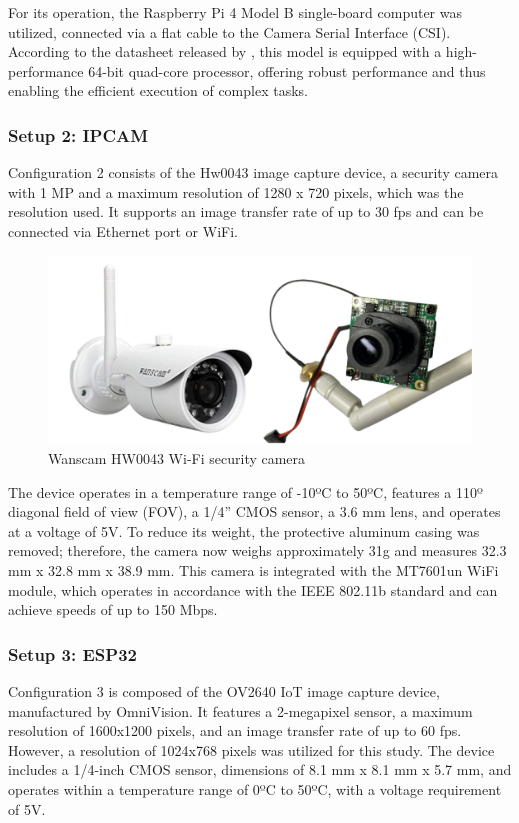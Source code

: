 \documentclass[letterpaper]{article}
\begin{document}
For its operation, the Raspberry Pi 4 Model B single-board computer was utilized, connected via a flat cable to the Camera Serial Interface (CSI). According to the datasheet released by \cite{raspberrypi4datasheet}, this model is equipped with a high-performance 64-bit quad-core processor, offering robust performance and thus enabling the efficient execution of complex tasks.

\subsubsection{Setup 2: IPCAM}
Configuration 2 consists of the Hw0043 image capture device, a security camera with 1 MP and a maximum resolution of 1280 x 720 pixels, which was the resolution used. It supports an image transfer rate of up to 30 fps and can be connected via Ethernet port or WiFi.

\begin{figure}[H]
\centering
\includegraphics[width=0.6\columnwidth]{images/setup_2.png}
\caption{Wanscam HW0043 Wi-Fi security camera}
\label{figure:setup_2}
\end{figure}

The device operates in a temperature range of -10ºC to 50ºC, features a 110º diagonal field of view (FOV), a 1/4” CMOS sensor, a 3.6 mm lens, and operates at a voltage of 5V. To reduce its weight, the protective aluminum casing was removed; therefore, the camera now weighs approximately 31g and measures 32.3 mm x 32.8 mm x 38.9 mm. This camera is integrated with the MT7601un WiFi module, which operates in accordance with the IEEE 802.11b standard and can achieve speeds of up to 150 Mbps.


\subsubsection{Setup 3: ESP32}
Configuration 3 is composed of the OV2640 IoT image capture device, manufactured by OmniVision. It features a 2-megapixel sensor, a maximum resolution of 1600x1200 pixels, and an image transfer rate of up to 60 fps. However, a resolution of 1024x768 pixels was utilized for this study. The device includes a 1/4-inch CMOS sensor, dimensions of 8.1 mm x 8.1 mm x 5.7 mm, and operates within a temperature range of 0ºC to 50ºC, with a voltage requirement of 5V.
\end{document}
